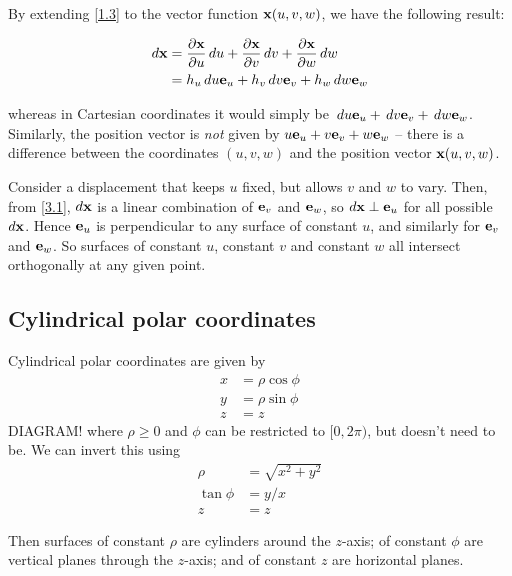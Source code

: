 \documentclass{../../template/note}
\begin{document}
    By extending \cref{1.3} to the vector function \(\V x(u, v, w)\), we have the following result:
    \begin{proposition}
        \label{3.1}\begin{align*}
            d\V x &= \pd{\V x}{u} \D u + \pd{\V x}{v} \D v + \pd{\V x}{w} \D w \\
            &= h_u \D u \V e_u + h_v \D v \V e_v + h_w \D w \V e_w
        \end{align*}
    \end{proposition}
    whereas in Cartesian coordinates it would simply be \(\D u \V e_u + \D v \V e_v + \D w \V e_w\). Similarly, the position vector is \emph{not} given by \(u \V e_u + v \V e_v + w \V e_w\) -- there is a difference between the coordinates \((u, v, w)\) and the position vector \(\V x(u, v, w)\).

    Consider a displacement that keeps \(u\) fixed, but allows \(v\) and \(w\) to vary. Then, from \cref{3.1}, \(d\V x\) is a linear combination of \(\V e_v\) and \(\V e_w\), so \(d\V x \perp \V e_u\) for all possible \(d\V x\). Hence \(\V e_u\) is perpendicular to any surface of constant \(u\), and similarly for \(\V e_v\) and \(\V e_w\). So surfaces of constant \(u\), constant \(v\) and constant \(w\) all intersect orthogonally at any given point.

    \subsection{Cylindrical polar coordinates}

    \begin{definition*}
        Cylindrical polar coordinates are given by
        \begin{align*}
            x &= \rho \cos \phi \\
            y &= \rho \sin \phi \\
            z &= z
        \end{align*}
        DIAGRAM!
        where \(\rho \geq 0\) and \(\phi\) can be restricted to \([0, 2\pi)\), but doesn't need to be. We can invert this using
        \begin{align*}
            \rho &= \sqrt{x^2+y^2} \\
            \tan \phi &= y/x \\
            z &= z
        \end{align*} 
    \end{definition*}
    
    Then surfaces of constant \(\rho\) are cylinders around the \(z\)-axis; of constant \(\phi\) are vertical planes through the \(z\)-axis; and of constant \(z\) are horizontal planes. 
    
\end{document}
